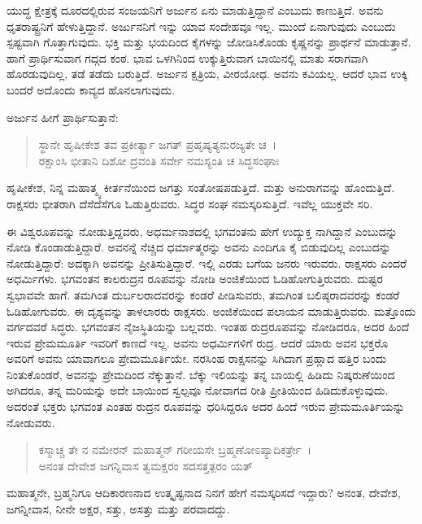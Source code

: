 ಯುದ್ಧ ಕ್ಷೇತ್ರಕ್ಕೆ ದೂರದಲ್ಲಿರುವ ಸಂಜಯನಿಗೆ ಅರ್ಜುನ ಏನು ಮಾಡುತ್ತಿದ್ದಾನೆ ಎಂಬುದು ಕಾಣುತ್ತಿದೆ. ಅವನು ಧೃತರಾಷ್ಟ್ರನಿಗೆ ಹೇಳುತ್ತಿದ್ದಾನೆ. ಅರ್ಜುನನಿಗೆ ಇನ್ನು ಯಾವ ಸಂದೇಹವೂ ಇಲ್ಲ. ಮುಂದೆ ಏನಾಗುವುದು ಎಂಬುದು ಸ್ಪಷ್ಟವಾಗಿ ಗೊತ್ತಾಗುವುದು. ಭಕ್ತಿ ಮತ್ತು ಭಯದಿಂದ ಕೈಗಳನ್ನು ಜೋಡಿಸಿಕೊಂಡು ಕೃಷ್ಣನನ್ನು ಪ್ರಾರ್ಥನೆ ಮಾಡುತ್ತಾನೆ. ಹಾಗೆ ಪ್ರಾರ್ಥಿಸುವಾಗ ಗದ್ಗದ ಕಂಠ. ಭಾವ ಒಳಗಿನಿಂದ ಉಕ್ಕುತ್ತಿರುವಾಗ ಬಾಯಿನಲ್ಲಿ ಮಾತು ಸರಾಗವಾಗಿ ಹೊರಡುವುದಿಲ್ಲ, ತಡೆ ತಡೆದು ಬರುತ್ತಿದೆ. ಅರ್ಜುನ ಕ್ಷತ್ರಿಯ, ವೀರಯೋಧ. ಅವನು ಕವಿಯಲ್ಲ. ಆದರೆ ಭಾವ ಉಕ್ಕಿ ಬಂದರೆ ಅದೊಂದು ಕಾವ್ಯದ ಹೊನಲಾಗುವುದು.

ಅರ್ಜುನ ಹೀಗೆ ಪ್ರಾರ್ಥಿಸುತ್ತಾನೆ:

\begin{verse}
ಸ್ಥಾನೇ ಹೃಷೀಕೇಶ ತವ ಪ್ರಕೀರ್ತ್ಯಾ ಜಗತ್ ಪ್ರಹೃಷ್ಯತ್ಯನುರಜ್ಯತೇ ಚ~।\\ರಕ್ಷಾಂಸಿ ಭೀತಾನಿ ದಿಶೋ ದ್ರವಂತಿ ಸರ್ವೇ ನಮಸ್ಯಂತಿ ಚ ಸಿದ್ಧಸಂಘಾಃ 
\end{verse}

{\small ಹೃಷೀಕೇಶ, ನಿನ್ನ ಮಹಾತ್ಮ್ಯ ಕೀರ್ತನೆಯಿಂದ ಜಗತ್ತು ಸಂತೋಷಪಡುತ್ತಿದೆ. ಮತ್ತು ಅನುರಾಗವನ್ನು ಹೊಂದುತ್ತಿದೆ. ರಾಕ್ಷಸರು ಭೀತರಾಗಿ ದೆಸೆದೆಸೆಗೂ ಓಡುತ್ತಿರುವರು. ಸಿದ್ಧರ ಸಂಘ ನಮಸ್ಕರಿಸುತ್ತಿದೆ. ಇವೆಲ್ಲ ಯುಕ್ತವೇ ಸರಿ.}

ಈ ವಿಶ್ವರೂಪವನ್ನು ನೋಡುತ್ತಿದ್ದವರು, ಅಧರ್ಮನಾಶದಲ್ಲಿ ಭಗವಂತನು ಹೇಗೆ ಉದ್ಯುಕ್ತ ನಾಗಿದ್ದಾನೆ ಎಂಬುದನ್ನು ನೋಡಿ ಕೊಂಡಾಡುತ್ತಿದ್ದಾರೆ. ಅವನನ್ನೆ ನೆಚ್ಚಿದ ಧರ್ಮಾತ್ಮರನ್ನು ಅವನು ಎಂದಿಗೂ ಕೈ ಬಿಡುವುದಿಲ್ಲ ಎಂಬುದನ್ನು ನೋಡುತ್ತಿದ್ದಾರೆ: ಅದಕ್ಕಾಗಿ ಅವನನ್ನು ಪ್ರೀತಿಸುತ್ತಿದ್ದಾರೆ. ಇಲ್ಲಿ ಎರಡು ಬಗೆಯ ಜನರು ಇರುವರು. ರಾಕ್ಷಸರು ಎಂದರೆ ಅಧರ್ಮಿಗಳು. ಭಗವಂತನ ಕಾಲರುದ್ರನ ರೂಪವನ್ನು ನೋಡಿ ಅಂಜಿಕೆಯಿಂದ ಓಡಿಹೋಗುತ್ತಿರುವರು. ದುಷ್ಟರ ಸ್ವಭಾವವೇ ಹಾಗೆ. ತಮಗಿಂತ ದುರ್ಬಲರಾದವರನ್ನು ಕಂಡರೆ ಪೀಡಿಸುವರು, ತಮಗಿಂತ ಬಲಿಷ್ಠರಾದವರನ್ನು ಕಂಡರೆ ಓಡಿಹೋಗುವರು. ಈ ದೃಶ್ಯವನ್ನು ತಾಳಲಾರರು ರಾಕ್ಷಸರು. ಅಂಜಿಕೆಯಿಂದ ಪಲಾಯನ ಮಾಡುತ್ತಿರುವರು. ಮತ್ತೊಂದು ವರ್ಗದವರೆ ಸಿದ್ಧರು. ಭಗವಂತನ ನೈಜಸ್ಥಿತಿಯನ್ನು ಬಲ್ಲವರು. ಇಂತಹ ರುದ್ರರೂಪವನ್ನು ನೋಡಿದರೂ, ಅದರ ಹಿಂದೆ ಇರುವ ಪ್ರೇಮಮೂರ್ತಿ ಇವರಿಗೆ ಕಾಣದೆ ಇಲ್ಲ. ಅವನು ಅಧರ್ಮಿಗಳಿಗೆ ರುದ್ರ. ಆದರೆ ಯಾರು ಅವನ ಭಕ್ತರೊ ಅವರಿಗೆ ಅವನು ಯಾವಾಗಲೂ ಪ್ರೇಮಮೂರ್ತಿಯೇ. ನರಸಿಂಹ ರಾಕ್ಷಸನನ್ನು ಸಿಗಿದಾಗ ಪ್ರಹ್ಲಾದ ಹತ್ತಿರ ಬಂದು ನಿಂತುಕೊಂಡರೆ, ಅವನನ್ನು ಪ್ರೇಮದಿಂದ ನೆಕ್ಕುತ್ತಾನೆ. ಬೆಕ್ಕು ಇಲಿಯನ್ನು ತನ್ನ ಬಾಯಲ್ಲಿ ಹಿಡಿದು ನಿಷ್ಕರುಣೆಯಿಂದ ಅಗಿದರೂ, ತನ್ನ ಮರಿಯನ್ನು ಅದೇ ಬಾಯಿಂದ ಸ್ವಲ್ಪವೂ ನೋವಾಗದ ರೀತಿ ಪ್ರೀತಿಯಿಂದ ಹಿಡಿದುಕೊಳ್ಳುವುದು. ಅದರಂತೆ ಭಕ್ತರು ಭಗವಂತ ಎಂತಹ ರುದ್ರನ ರೂಪವನ್ನು ಧರಿಸಿದ್ದರೂ ಅದರ ಹಿಂದೆ ಇರುವ ಪ್ರೇಮಮೂರ್ತಿಯನ್ನು ನೋಡುವರು.

\begin{verse}
ಕಸ್ಮಾಚ್ಚ ತೇ ನ ನಮೇರನ್ ಮಹಾತ್ಮನ್ ಗರೀಯಸೇ ಬ್ರಹ್ಮಣೋಽಪ್ಯಾದಿಕರ್ತ್ರೇ~।\\ಅನಂತ ದೇವೇಶ ಜಗನ್ನಿವಾಸ ತ್ವಮಕ್ಷರಂ ಸದಸತ್ತತ್ಪರಂ ಯತ್ 
\end{verse}

{\small ಮಹಾತ್ಮನೇ, ಬ್ರಹ್ಮನಿಗೂ ಆದಿಕಾರಣನಾದ ಉತ್ಕೃಷ್ಟನಾದ ನಿನಗೆ ಹೇಗೆ ನಮಸ್ಕರಿಸದೆ ಇದ್ದಾರು? ಅನಂತ, ದೇವೇಶ, ಜಗನ್ನೀವಾಸ, ನೀನೇ ಅಕ್ಷರ, ಸತ್ತು, ಅಸತ್ತು ಮತ್ತು ಪರವಾದದ್ದು.}

